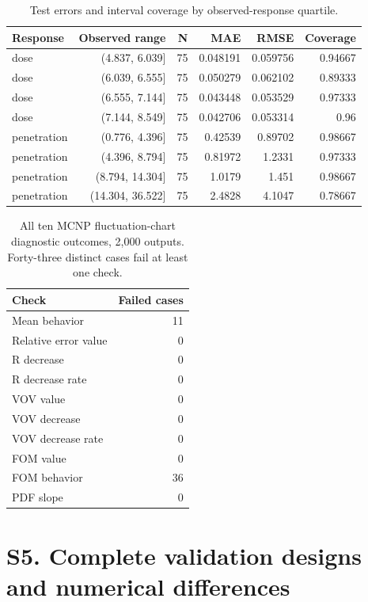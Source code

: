 \begin{table}[H]\centering\scriptsize
\caption{Test errors and interval coverage by observed-response quartile.}
\begin{tabular}{@{}lrrrrr@{}}
\toprule Response & Observed range & N & MAE & RMSE & Coverage\\\midrule
dose & (4.837, 6.039] & 75 & 0.048191 & 0.059756 & 0.94667\\
dose & (6.039, 6.555] & 75 & 0.050279 & 0.062102 & 0.89333\\
dose & (6.555, 7.144] & 75 & 0.043448 & 0.053529 & 0.97333\\
dose & (7.144, 8.549] & 75 & 0.042706 & 0.053314 & 0.96\\
penetration & (0.776, 4.396] & 75 & 0.42539 & 0.89702 & 0.98667\\
penetration & (4.396, 8.794] & 75 & 0.81972 & 1.2331 & 0.97333\\
penetration & (8.794, 14.304] & 75 & 1.0179 & 1.451 & 0.98667\\
penetration & (14.304, 36.522] & 75 & 2.4828 & 4.1047 & 0.78667\\
\bottomrule\end{tabular}\end{table}

\begin{table}[H]\centering\scriptsize
\caption{All ten MCNP fluctuation-chart diagnostic outcomes, 2,000 outputs. Forty-three distinct cases fail at least one check.}
\begin{tabular}{@{}lr@{}}
\toprule Check & Failed cases\\\midrule
Mean behavior & 11\\
Relative error value & 0\\
R decrease & 0\\
R decrease rate & 0\\
VOV value & 0\\
VOV decrease & 0\\
VOV decrease rate & 0\\
FOM value & 0\\
FOM behavior & 36\\
PDF slope & 0\\
\bottomrule\end{tabular}\end{table}

\section*{S5. Complete validation designs and numerical differences}

